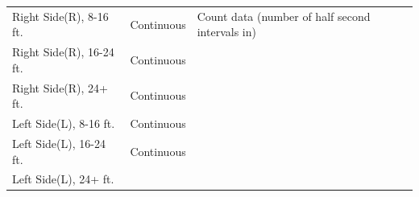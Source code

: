\documentclass[]{article}
\begin{document}
\begin{longtable}[]{@{}lll@{}}
\begin{minipage}[t]{0.32\columnwidth}
Right Side(R), 8-16 ft.\strut
\end{minipage} & \begin{minipage}[t]{0.12\columnwidth}\raggedright
Continuous\strut
\end{minipage} & \begin{minipage}[t]{0.47\columnwidth}\raggedright
Count data (number of half second intervals in)\strut
\end{minipage}\tabularnewline
\begin{minipage}[t]{0.32\columnwidth}\raggedright
Right Side(R), 16-24 ft.\strut
\end{minipage} & \begin{minipage}[t]{0.12\columnwidth}\raggedright
Continuous\strut
\end{minipage} & \begin{minipage}[t]{0.47\columnwidth}\raggedright
\strut
\end{minipage}\tabularnewline
\begin{minipage}[t]{0.32\columnwidth}\raggedright
Right Side(R), 24+ ft.\strut
\end{minipage} & \begin{minipage}[t]{0.12\columnwidth}\raggedright
Continuous\strut
\end{minipage} & \begin{minipage}[t]{0.47\columnwidth}\raggedright
\strut
\end{minipage}\tabularnewline
\begin{minipage}[t]{0.32\columnwidth}\raggedright
Left Side(L), 8-16 ft.\strut
\end{minipage} & \begin{minipage}[t]{0.12\columnwidth}\raggedright
Continuous\strut
\end{minipage} & \begin{minipage}[t]{0.47\columnwidth}\raggedright
\strut
\end{minipage}\tabularnewline
\begin{minipage}[t]{0.32\columnwidth}\raggedright
Left Side(L), 16-24 ft.\strut
\end{minipage} & \begin{minipage}[t]{0.12\columnwidth}\raggedright
Continuous\strut
\end{minipage} & \begin{minipage}[t]{0.47\columnwidth}\raggedright
\strut
\end{minipage}\tabularnewline
\begin{minipage}[t]{0.32\columnwidth}\raggedright
Left Side(L), 24+ ft.\strut

\end{minipage}
\end{longtable}
\end{document}
